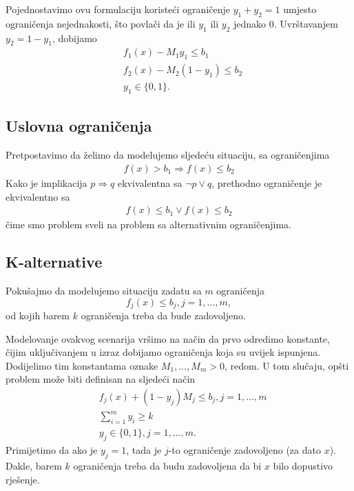 \documentclass[a4paper, utf8, 11pt, colorlinks]{book}
\theoremstyle{definition}
\begin{document}
Pojednostavimo ovu formulaciju koristeći ograničenje $y_1 + y_2 = 1$ umjesto ograničenja nejednakosti, što povlači da je ili $y_1$ ili $y_2$    jednako 0. Uvrštavanjem $y_2 =  1-y_1$,  dobijamo 
\begin{align*}
      & f_1(x) - M_1 y_1       \leq b_1 \\
      & f_2(x) - M_2 (1-y_1)   \leq b_2  \\
      & y_1 \in \{0,1 \}.
\end{align*}

\subsection{Uslovna ograničenja} 
Pretpostavimo da želimo da modelujemo sljedeću situaciju, sa ograničenjima 
\begin{align*}
    f(x) > b_1 \Rightarrow f(x) \leq b_2 
\end{align*}
Kako je implikacija $p \Rightarrow q$ ekvivalentna sa $\neg p \vee q$, prethodno ograničenje je ekvivalentno sa
\begin{align*}
    f(x) \leq b_1 \vee f(x) \leq b_2 
\end{align*}
čime smo problem sveli na problem sa alternativnim ograničenjima. 


\subsection{K-alternative} 

Pokušajmo da modelujemo situaciju zadatu sa $m$ ograničenja
$$f_j(x) \leq  b_j, j=1,\ldots,m,$$
od kojih barem $k$ ograničenja treba da bude zadovoljeno.

 Modelovanje ovakvog scenarija vršimo na način da prvo odredimo konstante, čijim uključivanjem u izraz dobijamo ograničenja koja su uvijek ispunjena. Dodijelimo tim konstantama oznake  $M_1, \ldots, M_m>0$, redom. U tom slučaju, opšti problem može biti definisan na sljedeći način
\begin{align}
     &f_j(x) + (1-y_j) M_j \leq b_j, j=1,\ldots,m\\
     & \sum_{i=1}^m y_i \geq k \\
     & y_j \in \{0,1\}, j=1,\ldots,m.
\end{align}
Primijetimo da ako je $y_j = 1$, tada je $j$-to ograničenje zadovoljeno (za dato $x$). Dakle, barem $k$ ograničenja treba da budu zadovoljena da bi $x$ bilo dopustivo rješenje. 
\end{document}
